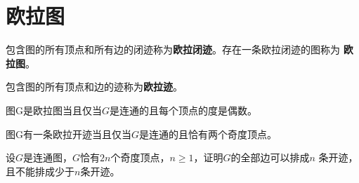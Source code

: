 \chapter{欧拉图}
\begin{Def}
包含图的所有顶点和所有边的闭迹称为{\bfseries 欧拉闭迹}。存在一条欧拉闭迹的图称为
{\bfseries 欧拉图}。
\end{Def}

\begin{Def}
  包含图的所有顶点和边的迹称为{\bfseries 欧拉迹}。
\end{Def}



\begin{Ex}
图G是欧拉图当且仅当$G$是连通的且每个顶点的度是偶数。
\end{Ex}
\begin{Ex}
图G有一条欧拉开迹当且仅当$G$是连通的且恰有两个奇度顶点。  
\end{Ex}
\begin{Ex}
      设$G$是连通图，$G$恰有$2n$个奇度顶点，$n \geq 1$，证明$G$的全部边可以排成$n$
      条开迹，且不能排成少于$n$条开迹。
\end{Ex}


